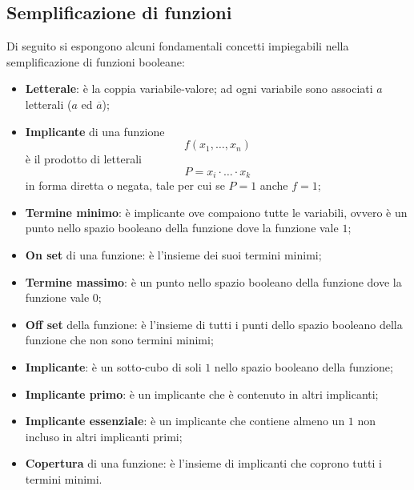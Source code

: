 \documentclass[a4paper]{extarticle}
\begin{document}
\vspace{1em}
\noindent
\subsection{Semplificazione di funzioni}
Di seguito si espongono alcuni fondamentali concetti impiegabili nella semplificazione di funzioni booleane:
\begin{itemize}
    \item \textbf{Letterale}: è la coppia variabile-valore; ad ogni variabile sono associati $a$ letterali ($a$ ed $\overline{a}$);
    \item \textbf{Implicante} di una funzione 
    \[f(x_1,\dots,x_n)\]
    è il prodotto di letterali 
    \[P=x_i \cdot \dots \cdot x_k\]
    in forma diretta o negata, tale per cui se $P=1$ anche $f=1$;
    \item \textbf{Termine minimo}: è implicante ove compaiono tutte le variabili, ovvero è un punto nello spazio booleano della funzione dove la funzione vale $1$;
    \item \textbf{On set} di una funzione: è l'insieme dei suoi termini minimi;
    \item \textbf{Termine massimo}: è un punto nello spazio booleano della funzione dove la funzione vale $0$;
    \item \textbf{Off set} della funzione: è l'insieme di tutti i punti dello spazio booleano della funzione che non sono termini minimi;
    \item \textbf{Implicante}: è un sotto-cubo di soli $1$ nello spazio booleano della funzione;
    \item \textbf{Implicante primo}: è un implicante che è contenuto in altri implicanti;
    \item \textbf{Implicante essenziale}: è un implicante che contiene almeno un $1$ non incluso in altri implicanti primi;
    \item \textbf{Copertura} di una funzione: è l'insieme di implicanti che coprono tutti i termini minimi.
\end{itemize}
\end{document}
